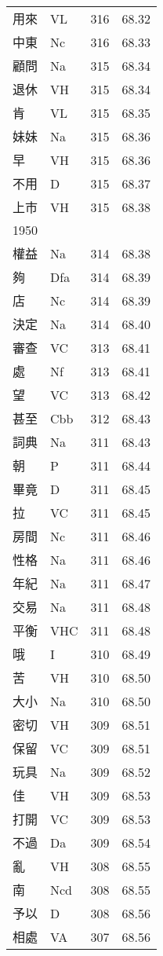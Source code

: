\documentclass[twocolumn]{book}
\begin{document}
\begin{supertabular}{llrr}
用來 & VL & 316 &  68.32\\
中東 & Nc & 316 &  68.33\\
顧問 & Na & 315 &  68.34\\
退休 & VH & 315 &  68.34\\
肯 & VL & 315 &  68.35\\
妹妹 & Na & 315 &  68.36\\
早 & VH & 315 &  68.36\\
不用 & D & 315 &  68.37\\
上市 & VH & 315 &  68.38\\
1950\\
權益 & Na & 314 &  68.38\\
夠 & Dfa & 314 &  68.39\\
店 & Nc & 314 &  68.39\\
決定 & Na & 314 &  68.40\\
審查 & VC & 313 &  68.41\\
處 & Nf & 313 &  68.41\\
望 & VC & 313 &  68.42\\
甚至 & Cbb & 312 &  68.43\\
詞典 & Na & 311 &  68.43\\
朝 & P & 311 &  68.44\\
畢竟 & D & 311 &  68.45\\
拉 & VC & 311 &  68.45\\
房間 & Nc & 311 &  68.46\\
性格 & Na & 311 &  68.46\\
年紀 & Na & 311 &  68.47\\
交易 & Na & 311 &  68.48\\
平衡 & VHC & 311 &  68.48\\
哦 & I & 310 &  68.49\\
苦 & VH & 310 &  68.50\\
大小 & Na & 310 &  68.50\\
密切 & VH & 309 &  68.51\\
保留 & VC & 309 &  68.51\\
玩具 & Na & 309 &  68.52\\
佳 & VH & 309 &  68.53\\
打開 & VC & 309 &  68.53\\
不過 & Da & 309 &  68.54\\
亂 & VH & 308 &  68.55\\
南 & Ncd & 308 &  68.55\\
予以 & D & 308 &  68.56\\
相處 & VA & 307 &  68.56\\

\end{supertabular}
\end{document}
